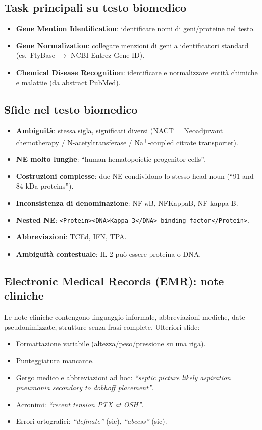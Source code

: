 \documentclass[a4paper,12pt]{article}
\begin{document}
\subsection{Task principali su testo biomedico}
\begin{itemize}
    \item \textbf{Gene Mention Identification}: identificare nomi di geni/proteine nel testo.
    \item \textbf{Gene Normalization}: collegare menzioni di geni a identificatori standard (es.\ FlyBase $\to$ NCBI Entrez Gene ID).
    \item \textbf{Chemical Disease Recognition}: identificare e normalizzare entit\`a chimiche e malattie (da abstract PubMed).
\end{itemize}

\subsection{Sfide nel testo biomedico}
\begin{itemize}
    \item \textbf{Ambiguit\`a}: stessa sigla, significati diversi (NACT = Neoadjuvant chemotherapy / N-acetyltransferase / Na\textsuperscript{+}-coupled citrate transporter).
    \item \textbf{NE molto lunghe}: ``human hematopoietic progenitor cells''.
    \item \textbf{Costruzioni complesse}: due NE condividono lo stesso head noun (``91 and 84 kDa proteins'').
    \item \textbf{Inconsistenza di denominazione}: NF-$\kappa$B, NFKappaB, NF-kappa B.
    \item \textbf{Nested NE}: \verb|<Protein><DNA>Kappa 3</DNA> binding factor</Protein>|.
    \item \textbf{Abbreviazioni}: TCEd, IFN, TPA.
    \item \textbf{Ambiguit\`a contestuale}: IL-2 pu\`o essere proteina o DNA.
\end{itemize}

\subsection{Electronic Medical Records (EMR): note cliniche}
Le note cliniche contengono linguaggio informale, abbreviazioni mediche, date pseudonimizzate, strutture senza frasi complete. Ulteriori sfide:
\begin{itemize}
    \item Formattazione variabile (altezza/peso/pressione su una riga).
    \item Punteggiatura mancante.
    \item Gergo medico e abbreviazioni ad hoc: \textit{``septic picture likely aspiration pneumonia secondary to dobhoff placement''}.
    \item Acronimi: \textit{``recent tension PTX at OSH''}.
    \item Errori ortografici: \textit{``definate''} (sic), \textit{``abcess''} (sic).
\end{itemize}
\end{document}

